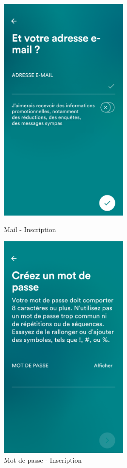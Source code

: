 $ $
\begin{figure}[h]
    \begin{minipage}[c]{.46\linewidth}
        \centering
        \includegraphics[width=6.5cm]{images/screen/mobile/3.png}
        \caption{Mail - Inscription}
    \end{minipage}
    \hfill%
    \begin{minipage}[c]{.46\linewidth}
        \centering
        \includegraphics[width=6.5cm]{images/screen/mobile/4.png}
        \caption{Mot de passe - Inscription}
    \end{minipage}
\end{figure}

